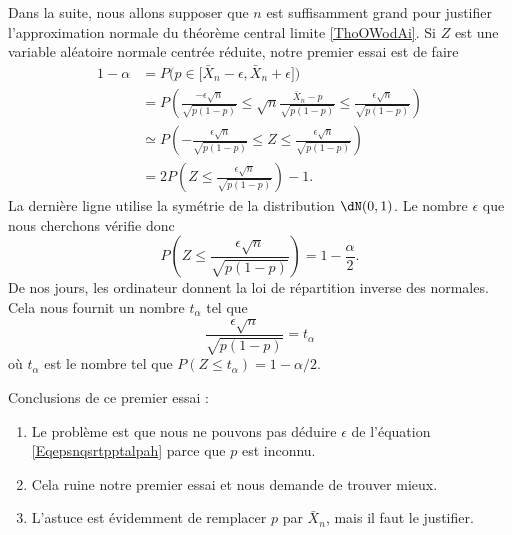 Dans la suite, nous allons supposer que \( n\) est suffisamment grand pour justifier l'approximation normale du théorème central limite \ref{ThoOWodAi}. Si \( Z\) est une variable aléatoire normale centrée réduite, notre premier essai est de faire
\begin{subequations}
    \begin{align}
        1-\alpha&=P\big( p\in\mathopen[ \bar X_n-\epsilon , \bar X_n+\epsilon \mathclose] \big) \label{subEqumaleftLthe}\\
        &=P\left( \frac{ -\epsilon\sqrt{n} }{ \sqrt{p(1-p)} }\leq \sqrt{n}\frac{ \bar X_n-p }{ \sqrt{p(1-p)} }\leq \frac{ \epsilon\sqrt{n} }{ \sqrt{p(1-p)} } \right)\\
        &\simeq P\left( -\frac{ \epsilon\sqrt{n} }{ \sqrt{p(1-p)} }\leq Z\leq \frac{ \epsilon\sqrt{n} }{ \sqrt{p(1-p)} } \right)\\
        &=2P\left( Z\leq \frac{ \epsilon\sqrt{n} }{ \sqrt{p(1-p)} } \right)-1.
    \end{align}
\end{subequations}
La dernière ligne utilise la symétrie de la distribution \( \dN(0,1)\). Le nombre \( \epsilon\) que nous cherchons vérifie donc
\begin{equation}
    P\left( Z\leq \frac{ \epsilon\sqrt{n} }{ \sqrt{p(1-p)} } \right)=1-\frac{ \alpha }{2}.
\end{equation}
De nos jours, les ordinateur donnent la loi de répartition inverse des normales. Cela nous fournit un nombre \( t_{\alpha}\) tel que
\begin{equation}    \label{Eqepsnqsrtpptalpah}
    \frac{ \epsilon\sqrt{n} }{ \sqrt{p(1-p)} }=t_{\alpha}
\end{equation}
où \( t_{\alpha}\) est le nombre tel que \( P(Z\leq t_{\alpha})=1-\alpha/2\). 

Conclusions de ce premier essai :
\begin{enumerate}
    \item

Le problème est que nous ne pouvons pas déduire \( \epsilon\) de l'équation \eqref{Eqepsnqsrtpptalpah} parce que \( p\) est inconnu.

\item
Cela ruine notre premier essai et nous demande de trouver mieux.

\item
L'astuce est évidemment de remplacer \( p\) par \( \bar X_n\), mais il faut le justifier. 
        
\end{enumerate}

